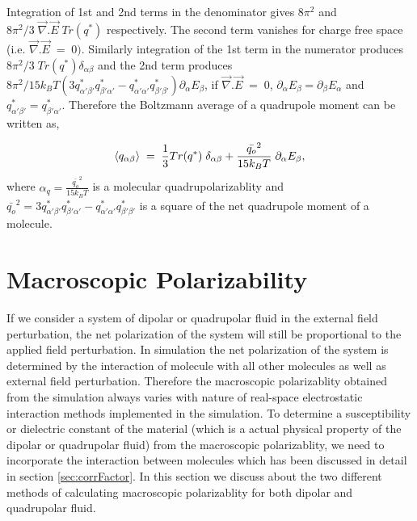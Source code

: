 Integration of 1st and 2nd terms in the denominator gives $8 \pi^2$
and $8 \pi^2 /3\;\vec{\nabla}.\vec{E}\; Tr(q^*) $ respectively. The
second term vanishes for charge free space
(i.e. $\vec{\nabla}.\vec{E} \; = \; 0)$. Similarly integration of the
1st term in the numerator produces
$8 \pi^2 /3\; Tr(q^*)\delta_{\alpha\beta}$ and the 2nd term produces
$8 \pi^2 /15k_B T (3{q}^*_{\alpha'\beta'}{q}^*_{\beta'\alpha'} -
{q}^*_{\alpha'\alpha'}{q}^*_{\beta'\beta'})\partial_\alpha E_\beta$,
if $\vec{\nabla}.\vec{E} \; = \; 0$,
$ \partial_\alpha E_\beta = \partial_\beta E_\alpha$ and
${q}^*_{\alpha'\beta'}= {q}^*_{\beta'\alpha'}$. Therefore the
Boltzmann average of a quadrupole moment can be written as,

\begin{equation}
\braket{q_{\alpha\beta}}\; = \; \frac{1}{3} Tr(q^*)\;\delta_{\alpha\beta} + \frac{{\bar{q_o}}^2}{15k_BT}\;\partial_\alpha E_\beta,
\end{equation}
where $ \alpha_q = \frac{{\bar{q_o}}^2}{15k_BT} $ is a molecular quadrupolarizablity  and  ${\bar{q_o}}^2=
3{q}^*_{\alpha'\beta'}{q}^*_{\beta'\alpha'}-{q}^*_{\alpha'\alpha'}{q}^*_{\beta'\beta'}$ is a square of the net quadrupole moment of a molecule. 

\section{Macroscopic Polarizability}
\label{sec:MacPolarizablity}

If we consider a system of dipolar or quadrupolar fluid in the external field perturbation, the net polarization of the system will still be proportional to the applied field perturbation.\cite{Chitanvis96, Stern-Feller03, SalvchovI14, SalvchovII14} In simulation the net polarization of the system is determined by the interaction of molecule with all other molecules as well as external field perturbation. Therefore the macroscopic polarizablity obtained from the simulation always varies with nature of real-space electrostatic interaction methods implemented in the simulation. To determine a susceptibility or dielectric constant of the material (which is a actual physical property of the dipolar or quadrupolar fluid) from the macroscopic polarizablity, we need to incorporate the interaction between molecules which has been discussed in detail in section \ref{sec:corrFactor}. In this section we discuss about the two different methods of calculating macroscopic polarizablity for both dipolar and quadrupolar fluid. 

